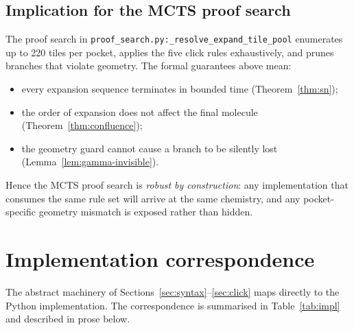 \subsection{Implication for the MCTS proof search}
The proof search in \texttt{proof\_search.py:\_resolve\_expand\_tile\_pool}
enumerates up to 220 tiles per pocket, applies the five click rules
exhaustively, and prunes branches that violate geometry. The
formal guarantees above mean:
\begin{itemize}
  \item every expansion sequence terminates in bounded time
        (Theorem~\ref{thm:sn});
  \item the order of expansion does not affect the final molecule
        (Theorem~\ref{thm:confluence});
  \item the geometry guard cannot cause a branch to be silently lost
        (Lemma~\ref{lem:gamma-invisible}).
\end{itemize}
Hence the MCTS proof search is \emph{robust by construction}: any
implementation that consumes the same rule set will arrive at the same
chemistry, and any pocket-specific geometry mismatch is exposed rather
than hidden.

\section{Implementation correspondence}
\label{sec:impl}
The abstract machinery of Sections~\ref{sec:syntax}--\ref{sec:click} maps
directly to the Python implementation. The correspondence is summarised in
Table~\ref{tab:impl} and described in prose below.

